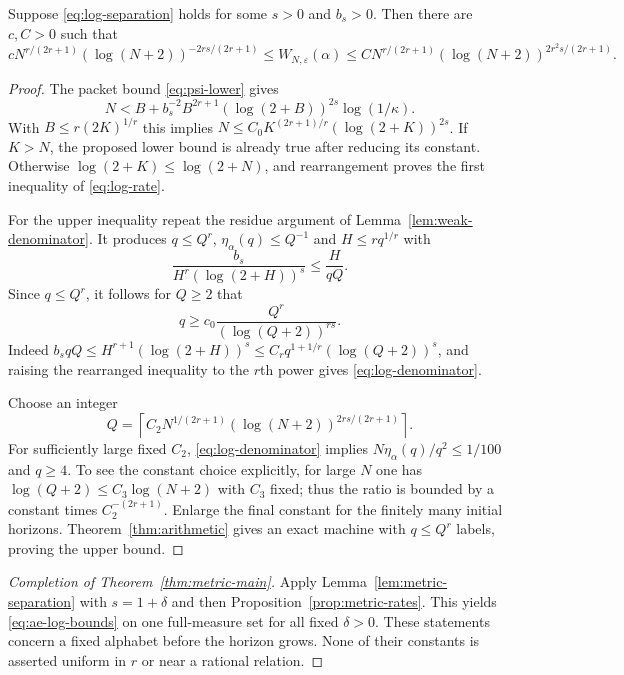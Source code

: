 \begin{proposition}\label{prop:metric-rates}
Suppose \eqref{eq:log-separation} holds for some $s>0$ and $b_s>0$. Then there are $c,C>0$ such that
\begin{equation}\label{eq:log-rate}
 cN^{r/(2r+1)}(\log(N+2))^{-2rs/(2r+1)}
 \le W_{N,\varepsilon}(\alpha)
 \le CN^{r/(2r+1)}(\log(N+2))^{2r^2s/(2r+1)}.
\end{equation}
\end{proposition}
\begin{proof}
The packet bound \eqref{eq:psi-lower} gives
\[
 N<B+b_s^{-2}B^{2r+1}(\log(2+B))^{2s}\log(1/\kappa).
\]
With $B\le r(2K)^{1/r}$ this implies
$N\le C_0K^{(2r+1)/r}(\log(2+K))^{2s}$.
If $K>N$, the proposed lower bound is already true after reducing its constant. Otherwise $\log(2+K)\le\log(2+N)$, and rearrangement proves the first inequality of \eqref{eq:log-rate}.

For the upper inequality repeat the residue argument of Lemma~\ref{lem:weak-denominator}. It produces $q\le Q^r$, $\eta_\alpha(q)\le Q^{-1}$ and $H\le rq^{1/r}$ with
\[
 \frac{b_s}{H^r(\log(2+H))^s}\le\frac{H}{qQ}.
\]
Since $q\le Q^r$, it follows for $Q\ge2$ that
\begin{equation}\label{eq:log-denominator}
                   q\ge c_0\frac{Q^r}{(\log(Q+2))^{rs}}.
\end{equation}
Indeed $b_sqQ\le H^{r+1}(\log(2+H))^s
\le C_rq^{1+1/r}(\log(Q+2))^s$, and raising the rearranged inequality to the $r$th power gives \eqref{eq:log-denominator}.

Choose an integer
\[
 Q=\left\lceil C_2N^{1/(2r+1)}
                   (\log(N+2))^{2rs/(2r+1)}\right\rceil.
\]
For sufficiently large fixed $C_2$, \eqref{eq:log-denominator} implies
$N\eta_\alpha(q)/q^2\le1/100$ and $q\ge4$. To see the constant choice explicitly, for large $N$ one has $\log(Q+2)\le C_3\log(N+2)$ with $C_3$ fixed; thus the ratio is bounded by a constant times $C_2^{-(2r+1)}$. Enlarge the final constant for the finitely many initial horizons. Theorem~\ref{thm:arithmetic} gives an exact machine with $q\le Q^r$ labels, proving the upper bound.
\end{proof}

\begin{proof}[Completion of Theorem~\ref{thm:metric-main}]
Apply Lemma~\ref{lem:metric-separation} with $s=1+\delta$ and then Proposition~\ref{prop:metric-rates}. This yields \eqref{eq:ae-log-bounds} on one full-measure set for all fixed $\delta>0$. These statements concern a fixed alphabet before the horizon grows. None of their constants is asserted uniform in $r$ or near a rational relation.
\end{proof}

